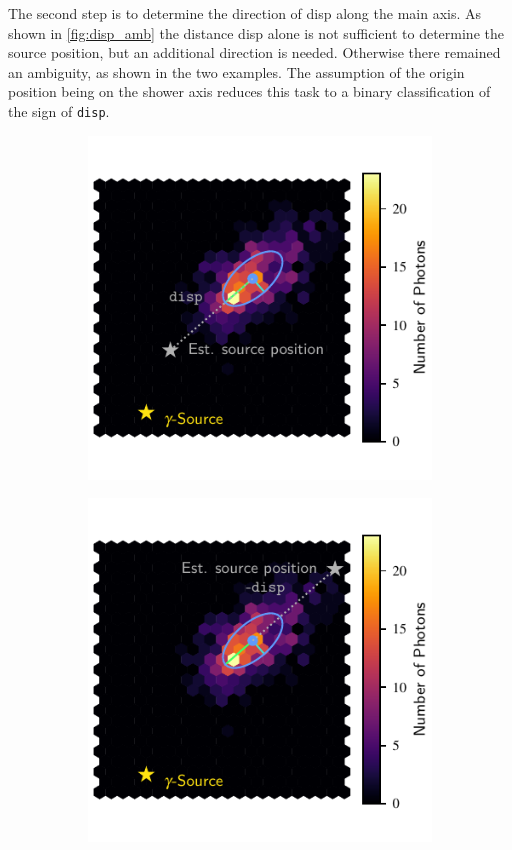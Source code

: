 The second step is to determine the direction of disp along
the main axis. As shown in \autoref{fig:disp_amb} the distance disp alone is
not sufficient to determine the source position, but an additional direction is
needed. Otherwise there remained an ambiguity, as shown in the two examples.
The assumption of the origin position being on the shower axis reduces this
task to a binary classification of the sign of \texttt{disp}.
%
\begin{figure}
  \begin{subfigure}{0.5\textwidth}
    \includegraphics[width=\textwidth]{Plots/hillas_4.pdf}
  \end{subfigure}
  \begin{subfigure}{0.5\textwidth}
    \includegraphics[width=\textwidth]{Plots/hillas_5.pdf}

\end{subfigure}
\end{figure}
